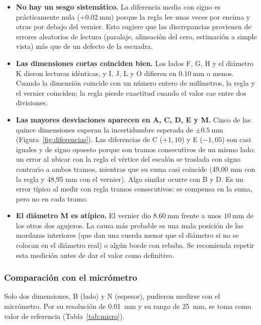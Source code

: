 \documentclass[12pt,a4paper]{article}
\begin{document}
\begin{itemize}
	\item \textbf{No hay un sesgo sistemático.} La diferencia media con signo es
	      prácticamente nula ($+\SI{0.02}{\milli\metre}$) porque la regla lee unas
	      veces
	      por encima y otras por debajo del vernier. Esto sugiere que las
	      discrepancias
	      provienen de errores aleatorios de lectura (paralaje, alineación del
	      cero,
	      estimación a simple vista) más que de un defecto de la escuadra.
	\item \textbf{Las dimensiones cortas coinciden bien.} Los lados F, G, H y el
	      diámetro K dieron lecturas idénticas, y I, J, L y O difieren en
	      $\SI{0.10}{\milli\metre}$ o menos. Cuando la dimensión coincide con un
	      número
	      entero de milímetros, la regla y el vernier coinciden; la regla pierde
	      exactitud
	      cuando el valor cae entre dos divisiones.
	\item \textbf{Las mayores desviaciones aparecen en A, C, D, E y M.} Cinco de
	      las quince dimensiones superan la incertidumbre esperada de
	      $\pm\SI{0.5}{\milli\metre}$ (Figura~\ref{fig:diferencias}). Las
	      diferencias de C
	      ($+1{,}10$) y E ($-1{,}05$) son casi iguales y de signo opuesto porque
	      son
	      tramos consecutivos de un mismo lado: un error al ubicar con la regla el
	      vértice
	      del escalón se traslada con signo contrario a ambos tramos, mientras que
	      su suma
	      casi coincide (49,00 mm con la regla y 48,95 mm con el vernier). Algo
	      similar
	      ocurre con B y D. Es un error típico al medir con regla tramos
	      consecutivos: se
	      compensa en la suma, pero no en cada tramo.
	\item \textbf{El diámetro M es atípico.} El vernier dio
	      $\SI{8.60}{\milli\metre}$ frente a unos $\SI{10}{\milli\metre}$ de los
	      otros dos agujeros. La causa más probable es una mala posición de las
	      mordazas interiores (que dan una cuerda menor que el diámetro si no se
	      colocan en el diámetro real) o algún borde con rebaba. Se recomienda
	      repetir esta medición antes de dar el valor como definitivo.
\end{itemize}

\subsubsection{Comparación con el micrómetro}

Solo dos dimensiones, B (lado) y N (espesor), pudieron medirse con el
micrómetro. Por su resolución de \SI{0.01}{\milli\metre} y su rango de
\SI{25}{\milli\metre}, se toma como valor de referencia (Tabla~\ref{tab:micro}).
\end{document}
